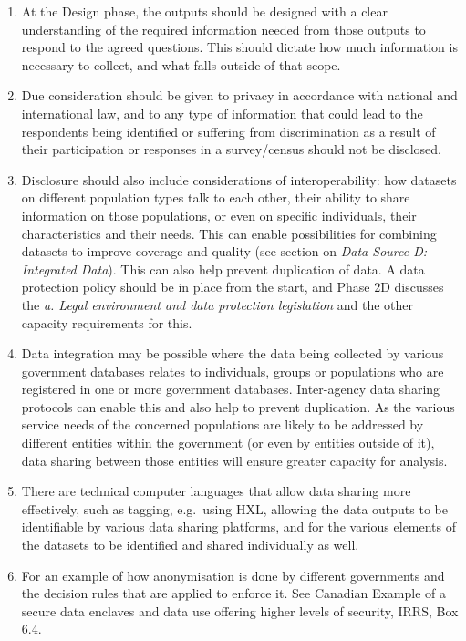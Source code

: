 \documentclass[
]{article}
\begin{document}
\begin{enumerate}
\def\labelenumi{\arabic{enumi}.}
\setcounter{enumi}{476}
\item
  At the Design phase, the outputs should be designed with a clear
  understanding of the required information needed from those outputs
  to respond to the agreed questions. This should dictate how much
  information is necessary to collect, and what falls outside of that
  scope.
\item
  Due consideration should be given to privacy in accordance with
  national and international law, and to any type of information that
  could lead to the respondents being identified or suffering from
  discrimination as a result of their participation or responses in a
  survey/census should not be disclosed.
\item
  Disclosure should also include considerations of interoperability:
  how datasets on different population types talk to each other, their
  ability to share information on those populations, or even on
  specific individuals, their characteristics and their needs. This
  can enable possibilities for combining datasets to improve coverage
  and quality (see section on \emph{Data Source D: Integrated Data}). This
  can also help prevent duplication of data. A data protection policy
  should be in place from the start, and Phase 2D discusses the \emph{a.
  Legal environment and data protection legislation} and the other
  capacity requirements for this.
\item
  Data integration may be possible where the data being collected by
  various government databases relates to individuals, groups or
  populations who are registered in one or more government databases.
  Inter-agency data sharing protocols can enable this and also help to
  prevent duplication. As the various service needs of the concerned
  populations are likely to be addressed by different entities within
  the government (or even by entities outside of it), data sharing
  between those entities will ensure greater capacity for analysis.
\item
  There are technical computer languages that allow data sharing more
  effectively, such as tagging, e.g.~using HXL, allowing the data
  outputs to be identifiable by various data sharing platforms, and
  for the various elements of the datasets to be identified and shared
  individually as well.
\item
  For an example of how anonymisation is done by different
  governments and the decision rules that are applied to enforce it.
  See Canadian Example of a secure data enclaves and data use offering
  higher levels of security, IRRS, Box 6.4.
\end{enumerate}
\end{document}
